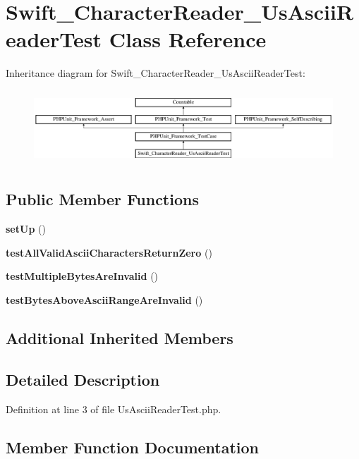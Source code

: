 \section{Swift\+\_\+\+Character\+Reader\+\_\+\+Us\+Ascii\+Reader\+Test Class Reference}
\label{class_swift___character_reader___us_ascii_reader_test}
Inheritance diagram for Swift\+\_\+\+Character\+Reader\+\_\+\+Us\+Ascii\+Reader\+Test\+:\begin{figure}[H]
\begin{center}
\leavevmode
\includegraphics[height=2.817610cm]{class_swift___character_reader___us_ascii_reader_test}
\end{center}
\end{figure}
\subsection*{Public Member Functions}
\begin{DoxyCompactItemize}
\item 
{\bf set\+Up} ()
\item 
{\bf test\+All\+Valid\+Ascii\+Characters\+Return\+Zero} ()
\item 
{\bf test\+Multiple\+Bytes\+Are\+Invalid} ()
\item 
{\bf test\+Bytes\+Above\+Ascii\+Range\+Are\+Invalid} ()
\end{DoxyCompactItemize}
\subsection*{Additional Inherited Members}


\subsection{Detailed Description}


Definition at line 3 of file Us\+Ascii\+Reader\+Test.\+php.



\subsection{Member Function Documentation}
